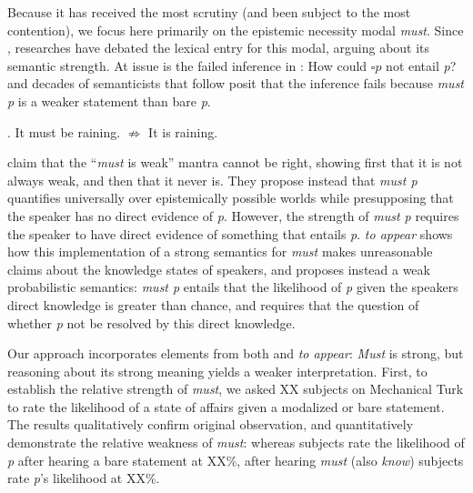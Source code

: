 \documentclass[12pt]{article}
\begin{document}
\noindent Because it has received the most scrutiny (and been subject to the most contention), we focus here primarily on the epistemic necessity modal \emph{must}. Since \citealt{karttunen1972}, researches have debated the lexical entry for this modal, arguing about its semantic strength. At issue is the failed inference in \Next: How could $\square$\hspace{2pt}$p$ not entail \emph{p}? \citeauthor{karttunen1972} and decades of semanticists that follow posit that the inference fails because \emph{must p} is a weaker statement than bare \emph{p}.

\ex. It must be raining. \hfil $\nRightarrow$ \hfil It is raining.

\citealt{vonfintelgillies2010} claim that the ``\emph{must} is weak'' mantra cannot be right, showing first that it is not always weak, and then that it never is. They propose instead that \emph{must p} quantifies universally over epistemically possible worlds while presupposing that the speaker has no direct evidence of \emph{p}. However, the strength of \emph{must p} requires the speaker to have direct evidence of something that entails \emph{p}.  \citeauthor{lassiter2014salt} \emph{to appear} shows how this implementation of a strong semantics for \emph{must} makes unreasonable claims about the knowledge states of speakers, and proposes instead a weak probabilistic semantics: \emph{must p} entails that the likelihood of \emph{p} given the speakers direct knowledge is greater than chance, and requires that the question of whether \emph{p} not be resolved by this direct knowledge.

Our approach incorporates elements from both \citealt{vonfintelgillies2010} and \citeauthor{lassiter2014salt} \emph{to appear}: \emph{Must} is strong, but reasoning about its strong meaning yields a weaker interpretation. First, to establish the relative strength of \emph{must}, we asked XX subjects on Mechanical Turk to rate the likelihood of a state of affairs given a modalized or bare statement. The results qualitatively confirm \citeauthor{karttunen1972} original observation, and quantitatively demonstrate the relative weakness of \emph{must}: whereas subjects rate the likelihood of \emph{p} after hearing a bare statement at XX\%, after hearing \emph{must} (also \emph{know}) subjects rate \emph{p}'s likelihood at XX\%. 
\end{document}

